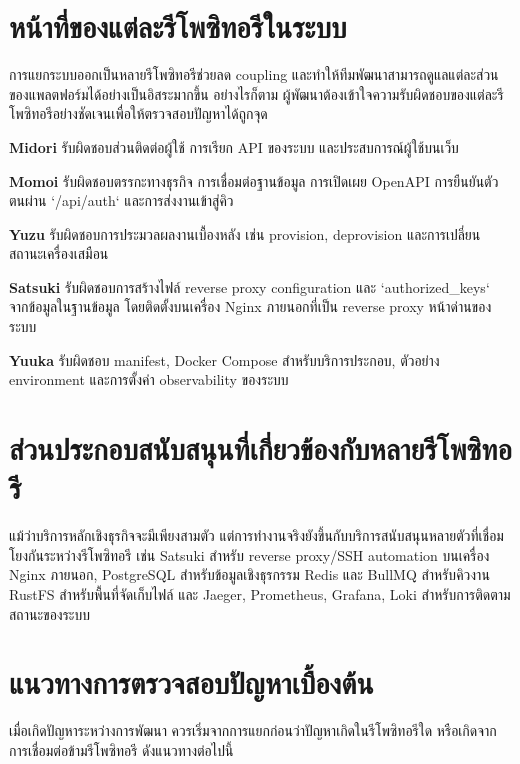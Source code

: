 \vspace{-0.5in}

\section{หน้าที่ของแต่ละรีโพซิทอรีในระบบ}
\hspace*{1.3em}
การแยกระบบออกเป็นหลายรีโพซิทอรีช่วยลด coupling และทำให้ทีมพัฒนาสามารถดูแลแต่ละส่วนของแพลตฟอร์มได้อย่างเป็นอิสระมากขึ้น อย่างไรก็ตาม ผู้พัฒนาต้องเข้าใจความรับผิดชอบของแต่ละรีโพซิทอรีอย่างชัดเจนเพื่อให้ตรวจสอบปัญหาได้ถูกจุด

\begin{mycustomenum2}
    \item \textbf{Midori} รับผิดชอบส่วนติดต่อผู้ใช้ การเรียก API ของระบบ และประสบการณ์ผู้ใช้บนเว็บ
    \item \textbf{Momoi} รับผิดชอบตรรกะทางธุรกิจ การเชื่อมต่อฐานข้อมูล การเปิดเผย OpenAPI การยืนยันตัวตนผ่าน `/api/auth` และการส่งงานเข้าสู่คิว
    \item \textbf{Yuzu} รับผิดชอบการประมวลผลงานเบื้องหลัง เช่น provision, deprovision และการเปลี่ยนสถานะเครื่องเสมือน
    \item \textbf{Satsuki} รับผิดชอบการสร้างไฟล์ reverse proxy configuration และ `authorized\_keys` จากข้อมูลในฐานข้อมูล โดยติดตั้งบนเครื่อง Nginx ภายนอกที่เป็น reverse proxy หน้าด่านของระบบ
    \item \textbf{Yuuka} รับผิดชอบ manifest, Docker Compose สำหรับบริการประกอบ, ตัวอย่าง environment และการตั้งค่า observability ของระบบ
\end{mycustomenum2}

\section{ส่วนประกอบสนับสนุนที่เกี่ยวข้องกับหลายรีโพซิทอรี}
\hspace*{1.3em}
แม้ว่าบริการหลักเชิงธุรกิจจะมีเพียงสามตัว แต่การทำงานจริงยังขึ้นกับบริการสนับสนุนหลายตัวที่เชื่อมโยงกันระหว่างรีโพซิทอรี เช่น Satsuki สำหรับ reverse proxy/SSH automation บนเครื่อง Nginx ภายนอก, PostgreSQL สำหรับข้อมูลเชิงธุรกรรม Redis และ BullMQ สำหรับคิวงาน RustFS สำหรับพื้นที่จัดเก็บไฟล์ และ Jaeger, Prometheus, Grafana, Loki สำหรับการติดตามสถานะของระบบ

\section{แนวทางการตรวจสอบปัญหาเบื้องต้น}
\hspace*{1.3em}
เมื่อเกิดปัญหาระหว่างการพัฒนา ควรเริ่มจากการแยกก่อนว่าปัญหาเกิดในรีโพซิทอรีใด หรือเกิดจากการเชื่อมต่อข้ามรีโพซิทอรี ดังแนวทางต่อไปนี้

